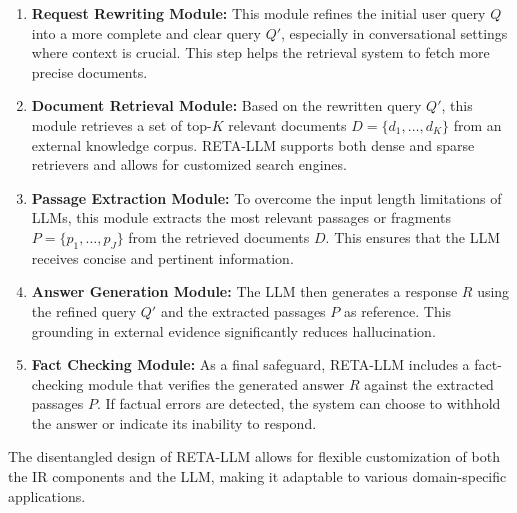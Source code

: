 \documentclass{article}
\begin{document}
\begin{enumerate}
    \item \textbf{Request Rewriting Module:} This module refines the initial user query $Q$ into a more complete and clear query $Q'$, especially in conversational settings where context is crucial. This step helps the retrieval system to fetch more precise documents.
    \item \textbf{Document Retrieval Module:} Based on the rewritten query $Q'$, this module retrieves a set of top-$K$ relevant documents $D = \{d_1, \dots, d_K\}$ from an external knowledge corpus. RETA-LLM supports both dense and sparse retrievers and allows for customized search engines.
    \item \textbf{Passage Extraction Module:} To overcome the input length limitations of LLMs, this module extracts the most relevant passages or fragments $P = \{p_1, \dots, p_J\}$ from the retrieved documents $D$. This ensures that the LLM receives concise and pertinent information.
    \item \textbf{Answer Generation Module:} The LLM then generates a response $R$ using the refined query $Q'$ and the extracted passages $P$ as reference. This grounding in external evidence significantly reduces hallucination.
    \item \textbf{Fact Checking Module:} As a final safeguard, RETA-LLM includes a fact-checking module that verifies the generated answer $R$ against the extracted passages $P$. If factual errors are detected, the system can choose to withhold the answer or indicate its inability to respond.
\end{enumerate}
The disentangled design of RETA-LLM allows for flexible customization of both the IR components and the LLM, making it adaptable to various domain-specific applications.
\end{document}
